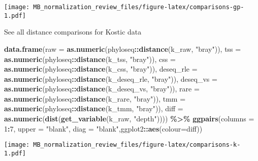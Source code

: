 \documentclass[
]{book}
\newenvironment{Shaded}{\begin{snugshade}}{\end{snugshade}}
\newcommand{\DataTypeTok}[1]{\textcolor[rgb]{0.13,0.29,0.53}{#1}}
\newcommand{\DecValTok}[1]{\textcolor[rgb]{0.00,0.00,0.81}{#1}}
\newcommand{\KeywordTok}[1]{\textcolor[rgb]{0.13,0.29,0.53}{\textbf{#1}}}
\newcommand{\NormalTok}[1]{#1}
\newcommand{\OperatorTok}[1]{\textcolor[rgb]{0.81,0.36,0.00}{\textbf{#1}}}
\newcommand{\StringTok}[1]{\textcolor[rgb]{0.31,0.60,0.02}{#1}}
\begin{document}
\texttt{[image: MB\_normalization\_review\_files/figure-latex/comparisons-gp-1.pdf]}

See all distance comparisons for Kostic data

\begin{Shaded}
\begin{Highlighting}[]
\KeywordTok{data.frame}\NormalTok{(}\DataTypeTok{raw =} \KeywordTok{as.numeric}\NormalTok{(phyloseq}\OperatorTok{::}\KeywordTok{distance}\NormalTok{(k\_raw, }\StringTok{"bray"}\NormalTok{)), }
           \DataTypeTok{tss =} \KeywordTok{as.numeric}\NormalTok{(phyloseq}\OperatorTok{::}\KeywordTok{distance}\NormalTok{(k\_tss, }\StringTok{"bray"}\NormalTok{)), }
           \DataTypeTok{css =} \KeywordTok{as.numeric}\NormalTok{(phyloseq}\OperatorTok{::}\KeywordTok{distance}\NormalTok{(k\_css, }\StringTok{"bray"}\NormalTok{)),}
           \DataTypeTok{deseq\_rle =} \KeywordTok{as.numeric}\NormalTok{(phyloseq}\OperatorTok{::}\KeywordTok{distance}\NormalTok{(k\_deseq\_rle, }\StringTok{"bray"}\NormalTok{)),}
           \DataTypeTok{deseq\_vs =} \KeywordTok{as.numeric}\NormalTok{(phyloseq}\OperatorTok{::}\KeywordTok{distance}\NormalTok{(k\_deseq\_vs, }\StringTok{"bray"}\NormalTok{)),}
           \DataTypeTok{rare =} \KeywordTok{as.numeric}\NormalTok{(phyloseq}\OperatorTok{::}\KeywordTok{distance}\NormalTok{(k\_rare, }\StringTok{"bray"}\NormalTok{)),}
           \DataTypeTok{tmm =} \KeywordTok{as.numeric}\NormalTok{(phyloseq}\OperatorTok{::}\KeywordTok{distance}\NormalTok{(k\_tmm, }\StringTok{"bray"}\NormalTok{)),}
           \DataTypeTok{diff =} \KeywordTok{as.numeric}\NormalTok{(}\KeywordTok{dist}\NormalTok{(}\KeywordTok{get\_variable}\NormalTok{(k\_raw, }\StringTok{"depth"}\NormalTok{)))) }\OperatorTok{\%\textgreater{}\%}\StringTok{ }
\StringTok{    }\KeywordTok{ggpairs}\NormalTok{(}\DataTypeTok{columns =} \DecValTok{1}\OperatorTok{:}\DecValTok{7}\NormalTok{, }\DataTypeTok{upper =} \StringTok{"blank"}\NormalTok{,}
            \DataTypeTok{diag =} \StringTok{"blank"}\NormalTok{,ggplot2}\OperatorTok{::}\KeywordTok{aes}\NormalTok{(}\DataTypeTok{colour=}\NormalTok{diff))}
\end{Highlighting}
\end{Shaded}

\texttt{[image: MB\_normalization\_review\_files/figure-latex/comparisons-k-1.pdf]}

  
\end{document}

